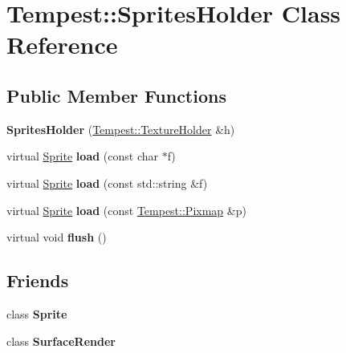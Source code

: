 \hypertarget{class_tempest_1_1_sprites_holder}{\section{Tempest\+:\+:Sprites\+Holder Class Reference}
\label{class_tempest_1_1_sprites_holder}
}
\subsection*{Public Member Functions}
\begin{DoxyCompactItemize}
\item 
\hypertarget{class_tempest_1_1_sprites_holder_a284b067c7235af1064097ef8b7bdf397}{{\bfseries Sprites\+Holder} (\hyperlink{class_tempest_1_1_texture_holder}{Tempest\+::\+Texture\+Holder} \&h)}\label{class_tempest_1_1_sprites_holder_a284b067c7235af1064097ef8b7bdf397}

\item 
\hypertarget{class_tempest_1_1_sprites_holder_aadd0e98c2dd4a0f631b681264e2ada9f}{virtual \hyperlink{class_tempest_1_1_sprite}{Sprite} {\bfseries load} (const char $\ast$f)}\label{class_tempest_1_1_sprites_holder_aadd0e98c2dd4a0f631b681264e2ada9f}

\item 
\hypertarget{class_tempest_1_1_sprites_holder_a32f7975c7081dc3afbc447147f2d3618}{virtual \hyperlink{class_tempest_1_1_sprite}{Sprite} {\bfseries load} (const std\+::string \&f)}\label{class_tempest_1_1_sprites_holder_a32f7975c7081dc3afbc447147f2d3618}

\item 
\hypertarget{class_tempest_1_1_sprites_holder_a8449a734eb651da24012f4226e99688e}{virtual \hyperlink{class_tempest_1_1_sprite}{Sprite} {\bfseries load} (const \hyperlink{class_tempest_1_1_pixmap}{Tempest\+::\+Pixmap} \&p)}\label{class_tempest_1_1_sprites_holder_a8449a734eb651da24012f4226e99688e}

\item 
\hypertarget{class_tempest_1_1_sprites_holder_aca10231930a1b0769f4236b4ef15ad0c}{virtual void {\bfseries flush} ()}\label{class_tempest_1_1_sprites_holder_aca10231930a1b0769f4236b4ef15ad0c}

\end{DoxyCompactItemize}
\subsection*{Friends}
\begin{DoxyCompactItemize}
\item 
\hypertarget{class_tempest_1_1_sprites_holder_a3292175d54d93d126ba2829249316344}{class {\bfseries Sprite}}\label{class_tempest_1_1_sprites_holder_a3292175d54d93d126ba2829249316344}

\item 
\hypertarget{class_tempest_1_1_sprites_holder_a9b082801c8cd4fe4c994d21e1fad565c}{class {\bfseries Surface\+Render}}\label{class_tempest_1_1_sprites_holder_a9b082801c8cd4fe4c994d21e1fad565c}

\end{DoxyCompactItemize}



